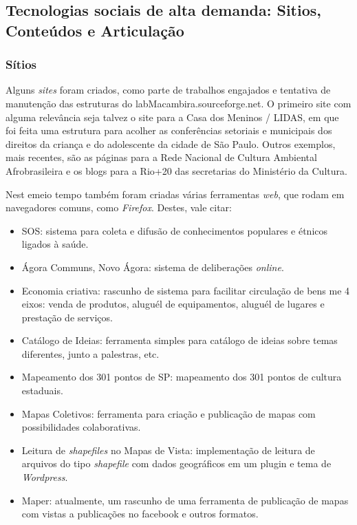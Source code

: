    \subsection{Tecnologias sociais de alta demanda: Sitios, Conteúdos e Articulação}

      \subsubsection{Sítios}

        Alguns \emph{sites} foram criados, como parte de trabalhos engajados e tentativa de manutenção das estruturas do labMacambira.sourceforge.net. O primeiro site com alguma relevância seja talvez o site para a Casa dos Meninos / LIDAS, em que foi feita uma estrutura para acolher as conferências setoriais e municipais dos direitos da criança e do adolescente da cidade de São Paulo. Outros exemplos, mais recentes, são as páginas para a Rede Nacional de Cultura Ambiental Afrobrasileira e os blogs para a Rio+20 das secretarias do Ministério da Cultura.

Nest emeio tempo também foram criadas várias ferramentas \emph{web}, que rodam em navegadores comuns, como \emph{Firefox}. Destes, vale citar:
\begin{itemize}
    \item SOS: sistema para coleta e difusão de conhecimentos populares e étnicos ligados à saúde.
    \item Ágora Communs, Novo Ágora: sistema de deliberações \emph{online}.
    \item Economia criativa: rascunho de sistema para facilitar circulação de bens me 4 eixos: venda de produtos, aluguél de equipamentos, aluguél de lugares e prestação de serviços.
    \item Catálogo de Ideias: ferramenta simples para catálogo de ideias sobre temas diferentes, junto a palestras, etc.
    \item Mapeamento dos 301 pontos de SP: mapeamento dos 301 pontos de cultura estaduais.
    \item Mapas Coletivos: ferramenta para criação e publicação de mapas com possibilidades colaborativas.
    \item Leitura de \emph{shapefiles} no Mapas de Vista: implementação de leitura de arquivos do tipo \emph{shapefile} com dados geográficos em um plugin e tema de \emph{Wordpress}.
    \item Maper: atualmente, um rascunho de uma ferramenta de publicação de mapas com vistas a publicações no facebook e outros formatos.
\end{itemize}

